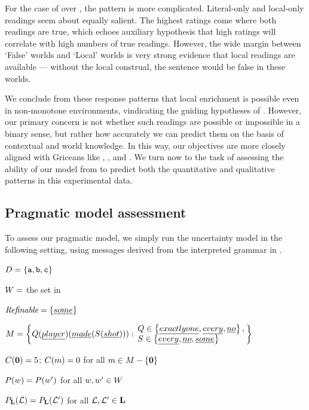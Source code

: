 \documentclass[leqno]{article}
\begin{document}
For the case of  over , the pattern is
more complicated. Literal-only and local-only readings seem about
equally salient. The highest ratings come where both readings are
true, which echoes  auxiliary
hypothesis that high ratings will correlate with high numbers of true
readings. However, the wide margin between `False' worlds and `Local'
worlds is very strong evidence that local readings are available ---
without the local construal, the sentence would be false in these
worlds. 

We conclude from these response patterns that local enrichment is
possible even in non-monotone environments, vindicating the guiding
hypotheses of \citet{Chemla:Spector:2011}. However, our primary
concern is not whether such readings are possible or impossible in a
binary sense, but rather how accurately we can predict them on the basis of contextual and world knowledge. In this
way, our objectives are more closely aligned with Griceans like
\citet{Geurts09}, \citet{Geurts:Pouscoulous:2009}, and
\citet{geurts-vantiel:2013:scalar}. We turn now to the task of
assessing the ability of our model from  to predict
both the quantitative and qualitative patterns in this experimental
data.


\subsection{Pragmatic model assessment}

To assess our pragmatic model, we simply run the uncertainty
model in the following setting, using messages derived from the
interpreted grammar in .

\begin{examples}
\item\label{expmod}
  \begin{examples}
  \item $D = \left\{ \texttt{a}, \texttt{b}, \texttt{c} \right\}$
  \item $W = $ the set in 
  \item $\textit{Refinable} = \left\{ \emph{some} \right\}$
  \item $\Messages =
    \setlength{\arraycolsep}{2pt}
    \set{
      Q(\word{player})(\word{made}(S(\word{shot}))) :
      \begin{array}{l}        
        Q \in \set{\word{exactly one}, \word{every}, \word{no}}, \\
        S \in \set{\word{every}, \word{no}, \word{some}}
      \end{array}}$
  \item $C(\mathbf{0}) = 5$; $C(m) = 0$ for all $m \in M-\left\{ \mathbf{0} \right\}$  
  \item $P(w) = P(w')$ for all $w, w' \in W$
  \item $P_{\mathbf{L}}(\mathcal{L}) = P_{\mathbf{L}}(\mathcal{L}')$ for all $\mathcal{L}, \mathcal{L}' \in \mathbf{L}$
  \end{examples}
\end{examples}
\end{document}
